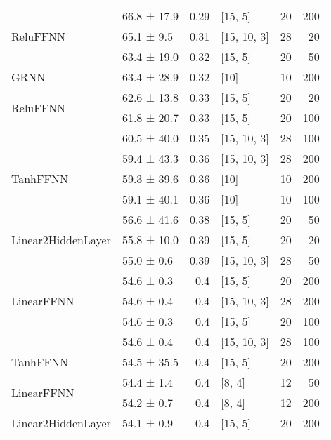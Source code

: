 \begin{table*}[h]
\begin{tabular}{llrlrr}
 \hline
\multirow{3}{*}{ReluFFNN}         & 66.8 ± 17.9 &  0.29 & [15, 5]        &         20 &      200 \\
         & 65.1 ± 9.5  &  0.31 & [15, 10, 3]    &         28 &       20 \\
         & 63.4 ± 19.0 &  0.32 & [15, 5]        &         20 &       50 \\
 \hline
GRNN         & 63.4 ± 28.9 &  0.32 & [10]           &         10 &      200 \\
 \hline
\multirow{2}{*}{ReluFFNN}         & 62.6 ± 13.8 &  0.33 & [15, 5]        &         20 &       20 \\
         & 61.8 ± 20.7 &  0.33 & [15, 5]        &         20 &      100 \\
 \hline
\multirow{5}{*}{TanhFFNN}         & 60.5 ± 40.0 &  0.35 & [15, 10, 3]    &         28 &      100 \\
         & 59.4 ± 43.3 &  0.36 & [15, 10, 3]    &         28 &      200 \\
         & 59.3 ± 39.6 &  0.36 & [10]           &         10 &      200 \\
         & 59.1 ± 40.1 &  0.36 & [10]           &         10 &      100 \\
         & 56.6 ± 41.6 &  0.38 & [15, 5]        &         20 &       50 \\
 \hline
Linear2HiddenLayer         & 55.8 ± 10.0 &  0.39 & [15, 5]        &         20 &       20 \\
 \hline
\multirow{5}{*}{LinearFFNN}         & 55.0 ± 0.6  &  0.39 & [15, 10, 3]    &         28 &       50 \\
         & 54.6 ± 0.3  &  0.4  & [15, 5]        &         20 &      200 \\
         & 54.6 ± 0.4  &  0.4  & [15, 10, 3]    &         28 &      200 \\
         & 54.6 ± 0.3  &  0.4  & [15, 5]        &         20 &      100 \\
         & 54.6 ± 0.4  &  0.4  & [15, 10, 3]    &         28 &      100 \\
 \hline
TanhFFNN         & 54.5 ± 35.5 &  0.4  & [15, 5]        &         20 &      200 \\
 \hline
\multirow{2}{*}{LinearFFNN}         & 54.4 ± 1.4  &  0.4  & [8, 4]         &         12 &       50 \\
         & 54.2 ± 0.7  &  0.4  & [8, 4]         &         12 &      200 \\
 \hline
\multirow{3}{*}{Linear2HiddenLayer}         & 54.1 ± 0.9  &  0.4  & [15, 5]        &         20 &      200 \\

\end{tabular}
\end{table*}
